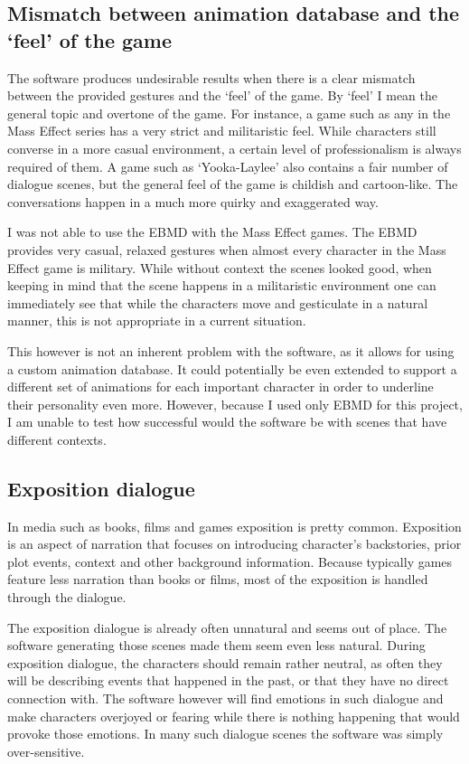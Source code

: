 \subsection{Mismatch between animation database and the `feel' of the game}
The software produces undesirable results when there is a clear mismatch between the provided gestures and the `feel' of the game. By `feel' I mean the general topic and overtone of the game. For instance, a game such as any in the Mass Effect series has a very strict and militaristic feel. While characters still converse in a more casual environment, a certain level of professionalism is always required of them. A game such as `Yooka-Laylee' also contains a fair number of dialogue scenes, but the general feel of the game is childish and cartoon-like. The conversations happen in a much more quirky and exaggerated way.

I was not able to use the EBMD with the Mass Effect games. The EBMD provides very casual, relaxed gestures when almost every character in the Mass Effect game is military. While without context the scenes looked good, when keeping in mind that the scene happens in a militaristic environment one can immediately see that while the characters move and gesticulate in a natural manner, this is not appropriate in a current situation.

This however is not an inherent problem with the software, as it allows for using a custom animation database. It could potentially be even extended to support a different set of animations for each important character in order to underline their personality even more. However, because I used only EBMD for this project, I am unable to test how successful would the software be with scenes that have different contexts.

\subsection{Exposition dialogue}
In media such as books, films and games exposition is pretty common. Exposition is an aspect of narration that focuses on introducing character's backstories, prior plot events, context and other background information. Because typically games feature less narration than books or films, most of the exposition is handled through the dialogue.

The exposition dialogue is already often unnatural and seems out of place. The software generating those scenes made them seem even less natural. During exposition dialogue, the characters should remain rather neutral, as often they will be describing events that happened in the past, or that they have no direct connection with. The software however will find emotions in such dialogue and make characters overjoyed or fearing while there is nothing happening that would provoke those emotions. In many such dialogue scenes the software was simply over-sensitive.

